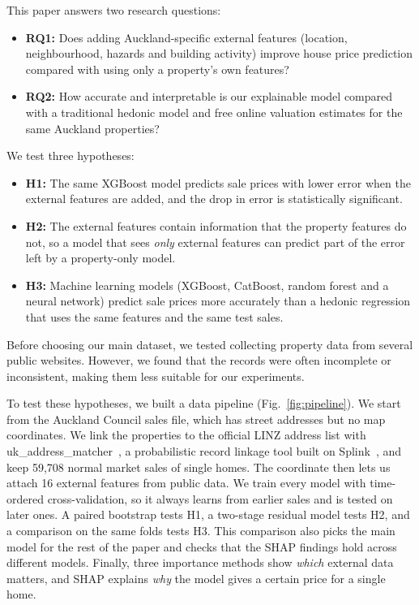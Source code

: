 \documentclass[conference]{IEEEtran}
\begin{document}
This paper answers two research questions:
\begin{itemize}
  \item \textbf{RQ1:} Does adding Auckland-specific external features
  (location, neighbourhood, hazards and building activity) improve house
  price prediction compared with using only a property's own features?
  \item \textbf{RQ2:} How accurate and interpretable is our explainable
  model compared with a traditional hedonic model and free online
  valuation estimates for the same Auckland properties?
\end{itemize}
We test three hypotheses:
\begin{itemize}
  \item \textbf{H1:} The same XGBoost model predicts sale prices with
  lower error when the external features are added, and the drop in
  error is statistically significant.
  \item \textbf{H2:} The external features contain information that the
  property features do not, so a model that sees \emph{only} external
  features can predict part of the error left by a property-only model.
  \item \textbf{H3:} Machine learning models (XGBoost, CatBoost, random
  forest and a neural network) predict sale prices more accurately than a
  hedonic regression that uses the same features and the same test
  sales.
\end{itemize}

Before choosing our main dataset, we tested collecting property data
from several public websites. However, we found that the records were
often incomplete or inconsistent, making them less suitable for our
experiments.

To test these hypotheses, we built a data pipeline
(Fig.~\ref{fig:pipeline}). We
start from the Auckland Council sales file, which has street addresses
but no map coordinates. We link the properties to the official LINZ
address list with uk\_address\_matcher~\cite{uam_docs}, a probabilistic
record linkage tool built on Splink~\cite{linacre2022}, and keep 59,708
normal market sales of single homes.
The coordinate then lets us attach 16 external features from public
data. We train every model with time-ordered cross-validation, so it
always learns from earlier sales and is tested on later ones. A paired
bootstrap tests H1, a two-stage residual model tests H2, and a
comparison on the same folds tests H3. This comparison also picks the
main model for the rest of the paper and checks that the SHAP findings
hold across different models. Finally, three importance methods show
\emph{which} external data matters, and SHAP explains \emph{why} the
model gives a certain price for a single home.
\end{document}
